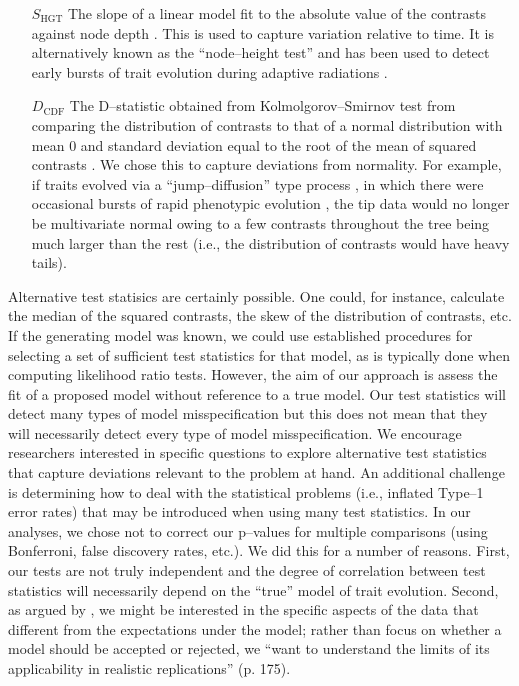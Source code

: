 \documentclass[a4paper,11pt]{article}
\begin{document}
\begin{enumerate}
\item[$S_{\text{HGT}}$] The slope of a linear model fit to the absolute value of the contrasts against node depth \citep[after][]{Purvis1995}. This is used to capture variation relative to time. It is alternatively known as the ``node--height test'' and has been used to detect early bursts of trait evolution during adaptive radiations \citep[see][for uses and modifications of this test]{FreckletonHarvey2006, SlaterPennell}. 

\item[$D_{\text{CDF}}$] The D--statistic obtained from Kolmolgorov--Smirnov test from comparing the distribution of contrasts to that of a normal distribution with mean $0$ and standard deviation equal to the root of the mean of squared contrasts \citep[the expected distribution of the contrasts under BM; see][]{Felsenstein1985, Rohlf2001}. We chose this to capture deviations from normality. For example, if traits evolved via a ``jump--diffusion'' type process \citep{Landis2012}, in which there were occasional bursts of rapid phenotypic evolution \citep{PennellPE}, the tip data would no longer be multivariate normal owing to a few contrasts throughout the tree being much larger than the rest (i.e., the distribution of contrasts would have heavy tails). 

\end{enumerate}

Alternative test statisics are certainly possible. One could, for instance, calculate the median of the squared contrasts, the skew of the distribution of contrasts, etc. If the generating model was known, we could use established procedures for selecting a set of sufficient \citep[or, approximately sufficient;][]{MajoramJoyce} test statistics for that model, as is typically done when computing likelihood ratio tests. However, the aim of our approach is assess the fit of a proposed model without reference to a true model. Our test statistics will detect many types of model misspecification but this does not mean that they will necessarily detect every type of model misspecification. We encourage researchers interested in specific questions to explore alternative test statistics that capture deviations relevant to the problem at hand. An additional challenge is determining how to deal with the statistical problems (i.e., inflated Type--1 error rates) that may be introduced when using many test statistics. In our analyses, we chose not to correct our p--values for multiple comparisons (using Bonferroni, false discovery rates, etc.). We did this for a number of reasons. First, our tests are not truly independent and the degree of correlation between test statistics will necessarily depend on the ``true'' model of trait evolution.  Second, as argued by \citet{Gelman2006}, we might be interested in the specific aspects of the data that different from the expectations under the model; rather than focus on whether a model should be accepted or rejected, we ``want to understand the limits of its applicability in realistic replications'' (p. 175). 
\end{document}
